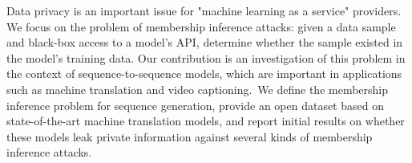Data privacy is an important issue for "machine learning as a service" providers. We focus on the problem of membership inference attacks: given a data sample and black-box access to a model's API, determine whether the sample existed in the model's training data. Our contribution is an investigation of this problem in the context of sequence-to-sequence models, which are important in applications such as machine translation and video captioning. We define the membership inference problem for sequence generation, provide an open dataset based on state-of-the-art machine translation models, and report initial results on whether these models leak private information against several kinds of membership inference attacks. 